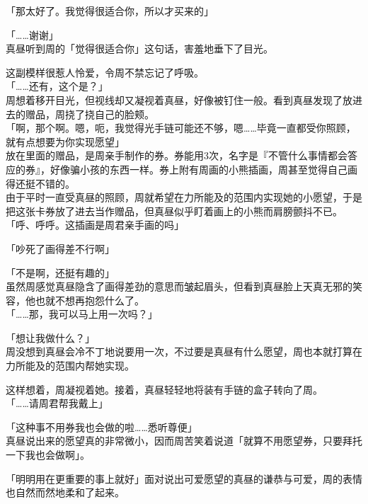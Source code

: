 「那太好了。我觉得很适合你，所以才买来的」

「……谢谢」\\

真昼听到周的「觉得很适合你」这句话，害羞地垂下了目光。

这副模样很惹人怜爱，令周不禁忘记了呼吸。\\

「……还有，这个是？」\\

周想着移开目光，但视线却又凝视着真昼，好像被钉住一般。看到真昼发现了放进去的赠品，周挠了挠自己的脸颊。\\

「啊，那个啊。嗯，呃，我觉得光手链可能还不够，嗯……毕竟一直都受你照顾，就有点想要为你实现愿望」\\

放在里面的赠品，是周亲手制作的券。券能用3次，名字是『不管什么事情都会答应的券』，好像骗小孩的东西一样。券上附有周画的小熊插画，周甚至觉得自己画得还挺不错的。\\

由于平时一直受真昼的照顾，周就希望在力所能及的范围内实现她的小愿望，于是把这张卡券放了进去当作赠品，但真昼似乎盯着画上的小熊而肩膀颤抖不已。\\

「呼、呼呼。这插画是周君亲手画的吗」

「吵死了画得差不行啊」

「不是啊，还挺有趣的」\\

虽然周感觉真昼隐含了画得差劲的意思而皱起眉头，但看到真昼脸上天真无邪的笑容，他也就不想再抱怨什么了。\\

「……那，我可以马上用一次吗？」

「想让我做什么？」\\

周没想到真昼会冷不丁地说要用一次，不过要是真昼有什么愿望，周也本就打算在力所能及的范围内帮她实现。

这样想着，周凝视着她。接着，真昼轻轻地将装有手链的盒子转向了周。\\

「……请周君帮我戴上」

「这种事不用券我也会做的啦……悉听尊便」\\

真昼说出来的愿望真的非常微小，因而周苦笑着说道「就算不用愿望券，只要拜托一下我也会做啊」。

「明明用在更重要的事上就好」面对说出可爱愿望的真昼的谦恭与可爱，周的表情也自然而然地柔和了起来。\\

